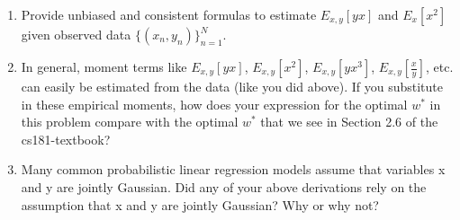\documentclass[submit]{harvardml}
\begin{document}
\begin{problem}
\begin{enumerate}
\item Provide unbiased and consistent formulas to estimate $E_{x, y}[yx]$
 and $E_x[x^2]$ given observed data $\{(x_n,y_n)\}_{n=1}^N$.

\item In general, moment terms like $E_{x, y}[yx]$, $E_{x, y}[x^2]$,
  $E_{x, y}[yx^3]$, $E_{x, y}[\frac{x}{y}]$, etc. can easily be
  estimated from the data (like you did above).  If you substitute in
  these empirical moments, how does your expression for the optimal
  $w^*$ in this problem compare with the optimal $w^*$ that we see in
  Section 2.6 of the cs181-textbook?

\item Many common probabilistic linear regression models assume that
  variables x and y are jointly Gaussian.  Did any of your above
  derivations rely on the assumption that x and y are jointly
  Gaussian?  Why or why not?
    
\end{enumerate}

\end{problem}
\end{document}
